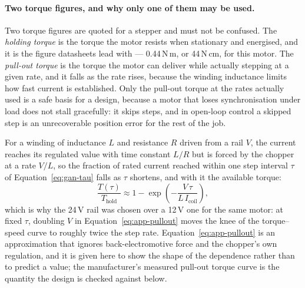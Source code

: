 
\paragraph{Two torque figures, and why only one of them may be used.}
Two torque figures are quoted for a stepper and must not be confused. The \emph{holding torque} is the torque the motor resists when stationary and energised, and it is the figure datasheets lead with --- 0.44\,N\,m, or 44\,N\,cm, for this motor. The \emph{pull-out torque} is the torque the motor can deliver while actually stepping at a given rate, and it falls as the rate rises, because the winding inductance limits how fast current is established. Only the pull-out torque at the rates actually used is a safe basis for a design, because a motor that loses synchronisation under load does not stall gracefully: it skips steps, and in open-loop control a skipped step is an unrecoverable position error for the rest of the job.

For a winding of inductance $L$ and resistance $R$ driven from a rail $V$, the current reaches its regulated value with time constant $L/R$ but is forced by the chopper at a rate $V/L$, so the fraction of rated current reached within one step interval $\tau$ of Equation~\ref{eq:gan-tau} falls as $\tau$ shortens, and with it the available torque:
\begin{equation}
\frac{T(\tau)}{T_{\mathrm{hold}}}\approx 1-\exp\!\left(-\frac{V\,\tau}{L\,I_{\mathrm{coil}}}\right),
\label{eq:app-pullout}
\end{equation}
which is why the 24\,V rail was chosen over a 12\,V one for the same motor: at fixed $\tau$, doubling $V$ in Equation~\ref{eq:app-pullout} moves the knee of the torque--speed curve to roughly twice the step rate. Equation~\ref{eq:app-pullout} is an approximation that ignores back-electromotive force and the chopper's own regulation, and it is given here to show the shape of the dependence rather than to predict a value; the manufacturer's measured pull-out torque curve is the quantity the design is checked against below.

